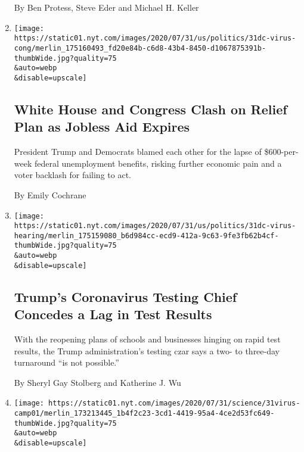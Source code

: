 \begin{enumerate}
  By Ben Protess, Steve Eder and Michael H. Keller
\item
  \href{/2020/07/31/us/politics/white-house-congress-relief-plan-jobless-aid.html}{}

  \texttt{[image: https://static01.nyt.com/images/2020/07/31/us/politics/31dc-virus-cong/merlin\_175160493\_fd20e84b-c6d8-43b4-8450-d1067875391b-thumbWide.jpg?quality=75\\\&auto=webp\\\&disable=upscale]}

  \hypertarget{white-house-and-congress-clash-on-relief-plan-as-jobless-aid-expires}{%
  \subsection{White House and Congress Clash on Relief Plan as Jobless
  Aid
  Expires}\label{white-house-and-congress-clash-on-relief-plan-as-jobless-aid-expires}}

  President Trump and Democrats blamed each other for the lapse of
  \$600-per-week federal unemployment benefits, risking further economic
  pain and a voter backlash for failing to act.

  By Emily Cochrane
\item
  \href{/2020/07/31/us/politics/trump-coronavirus-testing.html}{}

  \texttt{[image: https://static01.nyt.com/images/2020/07/31/us/politics/31dc-virus-hearing/merlin\_175159080\_b6d984cc-ecd9-412a-9c63-9fe3fb62b4cf-thumbWide.jpg?quality=75\\\&auto=webp\\\&disable=upscale]}

  \hypertarget{trumps-coronavirus-testing-chief-concedes-a-lag-in-test-results}{%
  \subsection{Trump's Coronavirus Testing Chief Concedes a Lag in Test
  Results}\label{trumps-coronavirus-testing-chief-concedes-a-lag-in-test-results}}

  With the reopening plans of schools and businesses hinging on rapid
  test results, the Trump administration's testing czar says a two- to
  three-day turnaround ``is not possible.''

  By Sheryl Gay Stolberg and Katherine J. Wu
\item
  \href{/2020/07/31/health/coronavirus-children-camp.html}{}

  \texttt{[image: https://static01.nyt.com/images/2020/07/31/science/31virus-camp01/merlin\_173213445\_1b4f2c23-3cd1-4419-95a4-4ce2d53fc649-thumbWide.jpg?quality=75\\\&auto=webp\\\&disable=upscale]}


\end{enumerate}
